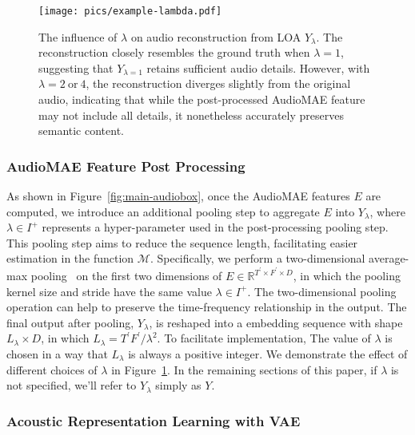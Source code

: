 \documentclass[lettersize,journal]{IEEEtran}
\begin{document}
\begin{figure}[t]
    \centering
    \texttt{[image: pics/example-lambda.pdf]}
    \caption{The influence of $\lambda$ on audio reconstruction from LOA $Y_{\lambda}$. The reconstruction closely resembles the ground truth when $\lambda=1$, suggesting that $Y_{\lambda=1}$ retains sufficient audio details. However, with $\lambda=2~\text{or}~4$, the reconstruction diverges slightly from the original audio, indicating that while the post-processed AudioMAE feature may not include all details, it nonetheless accurately preserves semantic content.}
    \label{fig: effect-of-lambda_compressed}
\end{figure}

\subsubsection{AudioMAE Feature Post Processing}

As shown in Figure~\ref{fig:main-audiobox}, once the AudioMAE features $E$ are computed, we introduce an additional pooling step to aggregate $E$ into $Y_{\lambda}$, where $\lambda\in I^{+}$ represents a hyper-parameter used in the post-processing pooling step. This pooling step aims to reduce the sequence length, facilitating easier estimation in the function $\mathcal{M}$.
Specifically, we perform a two-dimensional average-max pooling~\cite{liu2023simple} on the first two dimensions of $E\in \mathbb{R}^{T^{\prime}\times F^{\prime}\times D}$, in which the pooling kernel size and stride have the same value $\lambda\in I^{+}$. 
The two-dimensional pooling operation can help to preserve the time-frequency relationship in the output. 
The final output after pooling, $Y_{\lambda}$, is reshaped into a embedding sequence with shape $L_{\lambda}\times D$, in which $L_{\lambda}=T^{\prime}F^{\prime}/\lambda^{2} $. To facilitate implementation, The value of $\lambda$ is chosen in a way that $L_{\lambda}$ is always a positive integer. We demonstrate the effect of different choices of $\lambda$ in Figure~\ref{fig: effect-of-lambda_compressed}. In the remaining sections of this paper, if $\lambda$ is not specified, we'll refer to $Y_{\lambda}$ simply as $Y$.

\subsubsection{Acoustic Representation Learning with VAE}  
\end{document}
